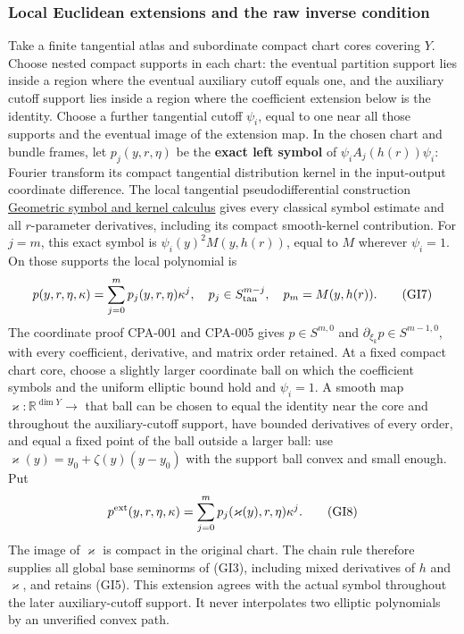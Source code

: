 \documentclass[
  11pt,
]{article}
\begin{document}
\subsubsection{Local Euclidean extensions and the raw inverse
condition}\label{local-euclidean-extensions-and-the-raw-inverse-condition}

Take a finite tangential atlas and subordinate compact chart cores
covering \(Y\). Choose nested compact supports in each chart: the
eventual partition support lies inside a region where the eventual
auxiliary cutoff equals one, and the auxiliary cutoff support lies
inside a region where the coefficient extension below is the identity.
Choose a further tangential cutoff \(\psi_i\), equal to one near all
those supports and the eventual image of the extension map. In the
chosen chart and bundle frames, let \(p_j(y,r,\eta)\) be the
\textbf{exact left symbol} of \(\psi_i A_j(h(r))\psi_i\): Fourier
transform its compact tangential distribution kernel in the input-output
coordinate difference. The local tangential pseudodifferential
construction \href{geometric-microlocal-calculus.pdf}{Geometric symbol
and kernel calculus} gives every classical symbol estimate and all
\(r\)-parameter derivatives, including its compact smooth-kernel
contribution. For \(j=m\), this exact symbol is
\(\psi_i(y)^2M(y,h(r))\), equal to \(M\) wherever \(\psi_i=1\). On those
supports the local polynomial is \[
 p(y,r,\eta,\kappa)=\sum_{j=0}^{m}p_j(y,r,\eta)\kappa^j,
 \quad p_j\in S^{m-j}_{\rm tan},\quad p_m=M(y,h(r)).
 \tag{GI7}
\] The coordinate proof CPA-001 and CPA-005 gives \(p\in S^{m,0}\) and
\(\partial_{\xi_k}p\in S^{m-1,0}\), with every coefficient, derivative,
and matrix order retained. At a fixed compact chart core, choose a
slightly larger coordinate ball on which the coefficient symbols and the
uniform elliptic bound hold and \(\psi_i=1\). A smooth map
\(\varkappa:\mathbb R^{\dim Y}\to\) that ball can be chosen to equal the
identity near the core and throughout the auxiliary-cutoff support, have
bounded derivatives of every order, and equal a fixed point of the ball
outside a larger ball: use \(\varkappa(y)=y_0+\zeta(y)(y-y_0)\) with the
support ball convex and small enough. Put \[
 p^{\rm ext}(y,r,\eta,\kappa)
 =\sum_{j=0}^{m}p_j(\varkappa(y),r,\eta)\kappa^j.
 \tag{GI8}
\] The image of \(\varkappa\) is compact in the original chart. The
chain rule therefore supplies all global base seminorms of (GI3),
including mixed derivatives of \(h\) and \(\varkappa\), and retains
(GI5). This extension agrees with the actual symbol throughout the later
auxiliary-cutoff support. It never interpolates two elliptic polynomials
by an unverified convex path.
\end{document}
